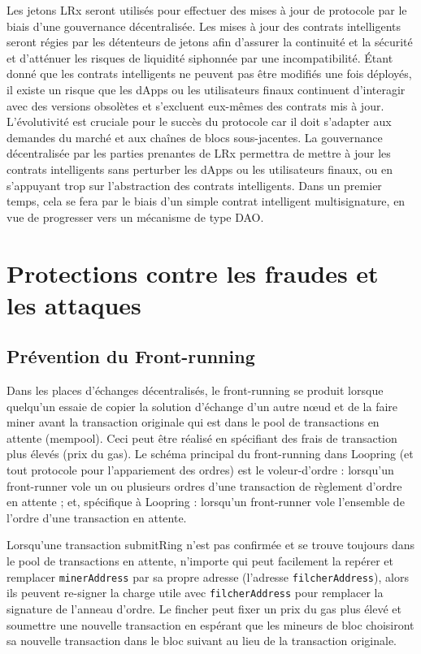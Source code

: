\documentclass[UTF8,nofonts]{article}
\begin{document}
\begin{multicols}{2}
Les jetons LRx seront utilisés pour effectuer des mises à jour de protocole par le biais d'une gouvernance décentralisée. Les mises à jour  des contrats intelligents seront régies par les détenteurs de jetons afin d'assurer la continuité et la sécurité et d'atténuer les risques de liquidité siphonnée par une incompatibilité. Étant donné que les contrats intelligents ne peuvent pas être modifiés une fois déployés, il existe un risque que les dApps ou les utilisateurs finaux continuent d'interagir avec des versions obsolètes et s'excluent eux-mêmes des contrats mis à jour. L'évolutivité est cruciale pour le succès du protocole car il doit s'adapter aux demandes du marché et aux chaînes de blocs sous-jacentes. La gouvernance décentralisée par les parties prenantes de LRx permettra de mettre à jour les contrats intelligents sans perturber les dApps ou les utilisateurs finaux, ou en s'appuyant trop sur l'abstraction des contrats intelligents. Dans un premier temps, cela se fera par le biais d'un simple contrat intelligent multisignature, en vue de progresser vers un mécanisme de type DAO.

\section{Protections contre les fraudes et les attaques}

\subsection{Prévention du Front-running\label{sec:dual_authoring}}

Dans les places d’échanges décentralisés, le front-running se produit lorsque quelqu'un essaie de copier la solution d’échange d'un autre nœud et de la faire miner avant la transaction originale qui est dans le pool de transactions en attente (mempool). Ceci peut être réalisé en spécifiant des frais de transaction plus élevés (prix du gas). Le schéma principal du front-running dans Loopring (et tout protocole pour l'appariement des ordres) est le voleur-d’ordre : lorsqu'un front-runner vole un ou plusieurs ordres d'une transaction de règlement d'ordre en attente ; et, spécifique à Loopring : lorsqu'un front-runner vole l'ensemble de l'ordre d'une transaction en attente.


Lorsqu'une transaction submitRing n'est pas confirmée et se trouve toujours dans le pool de transactions en attente, n'importe qui peut facilement la repérer et remplacer \verb|minerAddress| par sa propre adresse (l'adresse \verb|filcherAddress|), alors ils peuvent re-signer la charge utile avec \verb|filcherAddress| pour remplacer la signature de l'anneau d’ordre.  Le fincher peut fixer un prix du gas plus élevé et soumettre une nouvelle transaction en espérant que les mineurs de bloc choisiront sa nouvelle transaction dans le bloc suivant au lieu de la transaction originale.


\end{multicols}
\end{document}
